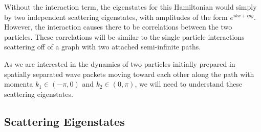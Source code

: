 \documentclass[../thesis-main/thesis-main]{subfiles}
\begin{document}
Without the interaction term, the eigenstates for this Hamiltonian would simply by two independent scattering eigenstates, with amplitudes of the form $e^{i k x + i py}$.  However, the interaction causes there to be correlations between the two particles.  These correlations will be similar to the single particle interactions scattering off of a graph with two attached semi-infinite paths.

As we are interested in the dynamics of two particles initially prepared in spatially separated wave packets moving toward each other along the path with momenta $k_1\in(-\pi,0) $ and $k_2\in (0,\pi)$, we will need to understand these scattering eigenstates.

\subsection{Scattering Eigenstates}
\end{document}

